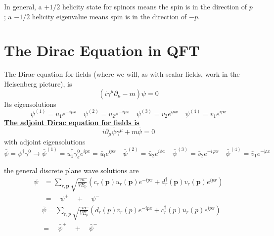 In general, a $+1 / 2$ helicity state for spinors means the spin is in the direction of $p$; a $-1 / 2$ helicity eigenvalue means spin is in the direction of $-p$.

\section{The Dirac Equation in QFT}
The Dirac equation for fields (where we will, as with scalar fields, work in the Heisenberg picture), is
\begin{equation}
\left(i \gamma^{\mu} \partial_{\mu}-m\right) \psi=0
\end{equation}
Its eigensolutions
\begin{equation}
\psi^{(1)}=u_{1} e^{-i p x} \quad \psi^{(2)}=u_{2} e^{-i p x} \quad \psi^{(3)}=v_{2} e^{i p x} \quad \psi^{(4)}=v_{1} e^{i p x}
\end{equation}
\textbf{\underline{The adjoint Dirac equation for fields is}}
\begin{equation}
i \partial_{\mu} \bar{\psi} \gamma^{\mu}+m \bar{\psi}=0
\end{equation}
with adjoint eigensolutions
\begin{equation}
\bar{\psi}=\psi^{\dagger} \gamma^{0} \rightarrow \bar{\psi}^{(1)}=u_{1}^{\dagger} \gamma_{e}^{0} e^{i p x}=\bar{u}_{\mathrm{l}} e^{i p x} \quad \bar{\psi}^{(2)}=\bar{u}_{2} e^{i \phi x} \quad \bar{\psi}^{(3)}=\bar{v}_{2} e^{-i \varphi x} \quad \bar{\psi}^{(4)}=\bar{v}_{1} e^{-\dot{\varphi} x}
\end{equation}
\begin{qt}
the general discrete plane wave solutions are
\begin{equation}
\begin{aligned}
\psi &=\sum_{r, \mathbf{p}} \sqrt{\frac{m}{V E_{\mathrm{p}}}}\left(c_{r}(\mathbf{p}) u_{r}(\mathbf{p}) e^{-i p x}+d_{r}^{\dagger}(\mathbf{p}) v_{r}(\mathbf{p}) e^{i p x}\right) \\
&=\quad \psi^{+} \quad+\quad \psi^{-}
\end{aligned}
\end{equation}
\begin{equation}
\begin{aligned}
&\bar{\psi}=\sum_{r, p} \sqrt{\frac{m}{V E_{p}}}\left(d_{r}(p) \bar{v}_{r}(p) e^{-i p x}+c_{r}^{\dagger}(p) \bar{u}_{r}(p) e^{i p x}\right)\\
&=\quad \bar{\psi}^{+} \quad+\quad \bar{\psi}^{-}
\end{aligned}
\end{equation}
\end{qt}
